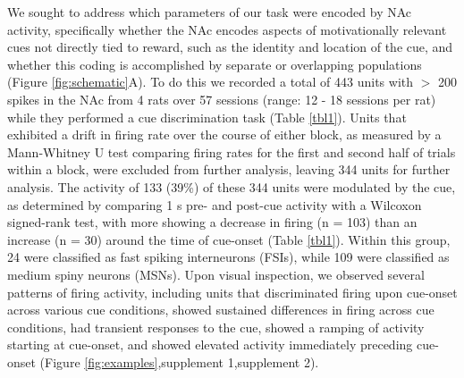 \documentclass[11pt]{article}
\begin{document}
We sought to address which parameters of our task were encoded by NAc
activity, specifically whether the NAc encodes aspects of
motivationally relevant cues not directly tied to reward, such as the
identity and location of the cue, and whether this coding is
accomplished by separate or overlapping populations (Figure
\ref{fig:schematic}A). To do this we recorded a total of 443 units
with $>$ 200 spikes in the NAc from 4 rats over 57 sessions (range: 12
- 18 sessions per rat) while they performed a cue discrimination task
(Table \ref{tbl1}). Units that exhibited a drift in firing rate over
the course of either block, as measured by a Mann-Whitney U test comparing
firing rates for the first and second half of trials within a block,
were excluded from further analysis, leaving 344 units for further
analysis. The activity of 133 (39\%) of these 344 units were modulated
by the cue, as determined by comparing 1 s pre- and post-cue activity with a Wilcoxon signed-rank test, with more showing a decrease in firing (n = 103) than an
increase (n = 30) around the time of cue-onset (Table
\ref{tbl1}). Within this group, 24 were classified as fast spiking interneurons (FSIs), while 109
were classified as medium spiny neurons (MSNs). Upon visual inspection, we observed several
patterns of firing activity, including units that discriminated firing
upon cue-onset across various cue conditions, showed sustained
differences in firing across cue conditions, had transient responses
to the cue, showed a ramping of activity starting at cue-onset, and
showed elevated activity immediately preceding cue-onset (Figure
\ref{fig:examples},supplement 1,supplement 2).
\end{document}
